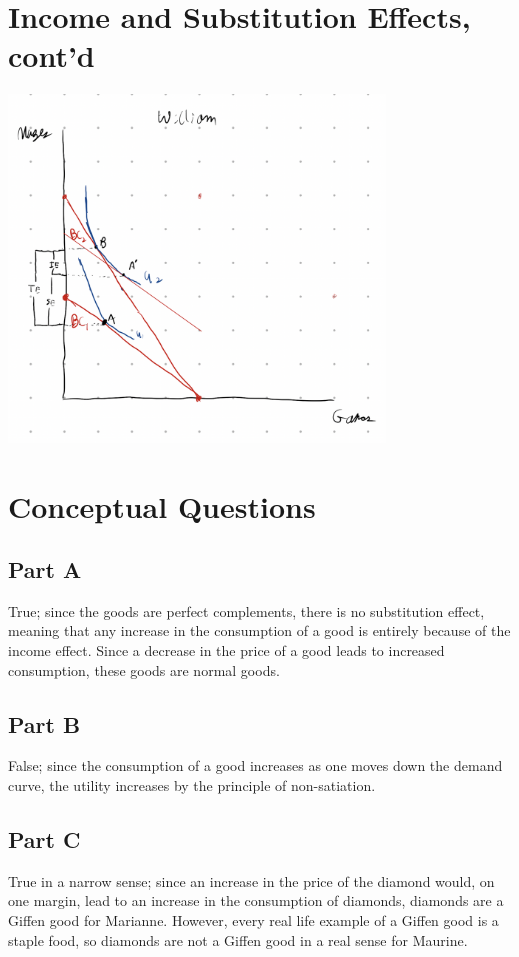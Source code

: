 \documentclass[8pt]{extarticle}
\begin{document}
{\section*{Income and Substitution Effects, cont'd}
\begin{center}
	\includegraphics[width=10cm]{HW4Q9}
\end{center}
\section*{Conceptual Questions}
\subsection*{Part A}
True; since the goods are perfect complements, there is no substitution effect, meaning that any increase in the consumption of a good is entirely because of the income effect. Since a decrease in the price of a good leads to increased consumption, these goods are normal goods.
\subsection*{Part B}
False; since the consumption of a good increases as one moves down the demand curve, the utility increases by the principle of non-satiation.
\subsection*{Part C}
True in a narrow sense; since an increase in the price of the diamond would, on one margin, lead to an increase in the consumption of diamonds, diamonds are a Giffen good for Marianne. However, every real life example of a Giffen good is a staple food, so diamonds are not a Giffen good in a real sense for Maurine.
}
\end{document}
